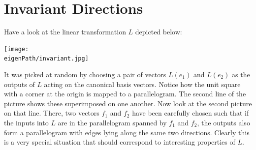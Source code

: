 %
%
%
%
%
%


\section{Invariant Directions}

Have a look at the linear transformation $L$ depicted below:
\begin{center}
\texttt{[image: \\eigenPath/invariant.jpg]}
\end{center}
It was picked at random by choosing a pair of vectors $L(e_1)$ and $L(e_2)$ as the outputs of $L$ acting on the canonical basis vectors.
Notice how the unit square with a corner at the origin is mapped to a parallelogram.  The second line of the picture 
shows these superimposed on one another. Now look at the second picture on that line. There, two vectors $f_1$ and $f_2$ have been carefully
chosen such that if the inputs into $L$ are in the parallelogram spanned by $f_1$ and $f_2$, the outputs also form a parallelogram with
edges lying along the same two directions. Clearly this is a very special situation that should correspond to  interesting properties of $L$.

